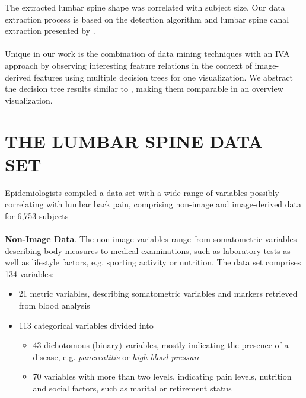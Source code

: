 \documentclass[a4paper,twoside]{style/article}
\begin{document}
The extracted lumbar spine shape was correlated with subject size.
Our data extraction process is based on the detection algorithm and lumbar spine canal extraction presented by \cite{Klemm2013VMV}.
\\\\
Unique in our work is the combination of data mining techniques with an IVA approach by observing interesting feature relations in the context of image-derived features using multiple decision trees for one visualization.
We abstract the decision tree results similar to \cite{Turkay}, making them comparable in an overview visualization.
\section{\uppercase{The Lumbar Spine Data Set}}
\label{sec:MaterialsAndMethod}
\noindent Epidemiologists compiled a data set with a wide range of variables possibly correlating with lumbar back pain, comprising non-image and image-derived data for 6,753 subjects
\\\\
\noindent \textbf{Non-Image Data}.
The non-image variables range from somatometric variables describing body measures to medical examinations, such as laboratory tests as well as lifestyle factors, e.g. sporting activity or nutrition.
The data set comprises 134 variables: %
\begin{itemize}
	\item 21 metric variables, describing somatometric variables and markers retrieved from blood analysis
	\item 113 categorical variables divided into
	\begin{itemize}
		\item 43 dichotomous (binary) variables, mostly indicating the presence of a disease, e.g. \emph{pancreatitis} or \emph{high blood pressure}
		\item 70 variables with more than two levels, indicating pain levels, nutrition and social factors, such as marital or retirement status
	\end{itemize}
\end{itemize}
\end{document}
